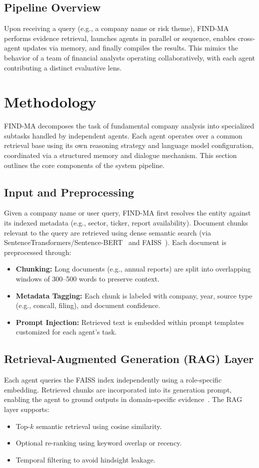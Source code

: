 \documentclass[11pt]{article}
\newcommand{\findma}{\textsc{FIND-MA}}
\begin{document}
\subsection*{Pipeline Overview}
Upon receiving a query (e.g., a company name or risk theme), \findma{} performs evidence retrieval, launches agents in parallel or sequence, enables cross-agent updates via memory, and finally compiles the results. This mimics the behavior of a team of financial analysts operating collaboratively, with each agent contributing a distinct evaluative lens.

\section{Methodology}
\label{sec:methodology}
\findma{} decomposes the task of fundamental company analysis into specialized subtasks handled by independent agents. Each agent operates over a common retrieval base using its own reasoning strategy and language model configuration, coordinated via a structured memory and dialogue mechanism. This section outlines the core components of the system pipeline.

\subsection*{Input and Preprocessing}
Given a company name or user query, \findma{} first resolves the entity against its indexed metadata (e.g., sector, ticker, report availability). Document chunks relevant to the query are retrieved using dense semantic search (via SentenceTransformers/Sentence-BERT~\citep{reimers2019sentencebert} and FAISS~\citep{johnson2017faiss}). Each document is preprocessed through:
\begin{itemize}
    \item \textbf{Chunking:} Long documents (e.g., annual reports) are split into overlapping windows of 300–500 words to preserve context.
    \item \textbf{Metadata Tagging:} Each chunk is labeled with company, year, source type (e.g., concall, filing), and document confidence.
    \item \textbf{Prompt Injection:} Retrieved text is embedded within prompt templates customized for each agent’s task.
\end{itemize}

\subsection*{Retrieval-Augmented Generation (RAG) Layer}
Each agent queries the FAISS index independently using a role-specific embedding. Retrieved chunks are incorporated into its generation prompt, enabling the agent to ground outputs in domain-specific evidence~\citep{lewis2020retrieval}. The RAG layer supports:
\begin{itemize}
    \item Top-$k$ semantic retrieval using cosine similarity.
    \item Optional re-ranking using keyword overlap or recency.
    \item Temporal filtering to avoid hindsight leakage.
\end{itemize}
\end{document}
